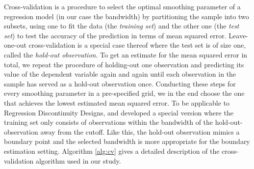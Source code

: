 \documentclass[11pt, a4paper, leqno]{article}
\numberwithin{equation}{section}
\numberwithin{figure}{section}
\numberwithin{table}{section}
\numberwithin{algorithm}{section}
\begin{document}
Cross-validation is a procedure to select the optimal smoothing parameter of a regression model (in our case the bandwidth) by partitioning the sample into two subsets, using one to fit the data (the \textit{training set}) and the other one (the \textit{test set}) to test the accuracy of the prediction in terms of mean squared error. Leave-one-out cross-validation is a special case thereof where the test set is of size one, called the \textit{hold-out observation}. To get an estimate for the mean squared error in total, we repeat the procedure of holding-out one observation and predicting its value of the dependent variable again and again until each observation in the sample has served as a hold-out observation once. Conducting these steps for every smoothing parameter in a pre-specified grid, we in the end choose the one that achieves the lowest estimated mean squared error. To be applicable to Regression Discontinuity Designs, \cite{imb_lemieux} and \cite{ludwig_miller} developed a special version where the training set only consists of observations within the bandwidth of the hold-out-observation away from the cutoff. Like this, the hold-out observation mimics a boundary point and the selected bandwidth is more appropriate for the boundary estimation setting. Algorithm \ref{alg:cv} gives a detailed description of the cross-validation algorithm used in our study.
\end{document}
